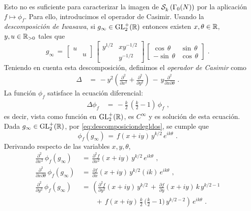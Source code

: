 Esto no es suficiente para caracterizar la imagen de $\mathcal{S}^{}_{k}\left(\Gamma_{0}(N)\right)$
por la aplicaci\'{o}n $f\mapsto\phi_{f}$. Para ello, introducimos el operador
de Casimir. Usando la \emph{descomposici\'{o}n de Iwasawa}, si
$g_{\infty}\in\mathrm{GL}^{+}_{2}(\mathbb{R})$ entonces existen $x,\theta\in\mathbb{R}$,
$y,u\in\mathbb{R}_{>0}$ tales que
\begin{equation}
	\label{eq:descomposiciondegldos}
	g_{\infty} \,=\,\begin{bmatrix} u & \\ & u \end{bmatrix}\,
		\begin{bmatrix} y^{1/2} & xy^{-1/2} \\
		& y^{-1/2} \end{bmatrix}\,
			\begin{bmatrix} \cos\,\theta & \sin\,\theta \\
			-\sin\,\theta & \cos\,\theta\end{bmatrix}
	\text{ .}
\end{equation}
%
Teniendo en cuenta esta descomposici\'{o}n, definimos el
\emph{operador de Casimir} como
\begin{align*}
	\Delta & \,=\, -y^{2}\left(
		\frac{\partial^{2}}{\partial x^{2}}+
		\frac{\partial^{2}}{\partial y^{2}} \right)\,-\,
		y\frac{\partial^{2}}{\partial x\partial\theta}
	\text{ .}
\end{align*}
%
La funci\'{o}n $\phi_{f}$ satisface la ecuaci\'{o}n diferencial:
\begin{align*}
	\Delta\phi_{f} & \,=\, -\frac{k}{2}\,
		\left(\frac{k}{2}-1\right)\,\phi_{f}
	\text{ ,}
\end{align*}
%
es decir, vista como funci\'{o}n en $\mathrm{GL}^{+}_{2}(\mathbb{R})$, es $C^{\infty}$ y
es soluci\'{o}n de esta ecuaci\'{o}n. Dada $g_{\infty}\in\mathrm{GL}^{+}_{2}(\mathbb{R})$,
por \eqref{eq:descomposiciondegldos}, se cumple que
\begin{equation}
	\label{eq:funcioncorrespondientefactorizacionelipticas}
	\phi_{f}(g_{\infty}) \,=\,f(x+iy)\,y^{k/2}\,e^{ik\theta}
	\text{ .}
\end{equation}
%
Derivando respecto de las variables $x,y,\theta$,
\begin{align*}
	\frac{\partial^{2}}{\partial x^{2}}\,\phi_{f}(g_{\infty})
		& \,=\,\frac{\partial^{2}f}{\partial x^{2}}(x+iy)\,
			y^{k/2}\,e^{ik\theta}\text{ ,} \\
	\frac{\partial^{2}}{\partial x\partial\theta}\,\phi_{f}(g_{\infty})
		& \,=\,\frac{\partial f}{\partial x}(x+iy)\,
			y^{k/2}(ik)\,e^{ik\theta}\text{ ,} \\
	\frac{\partial^{2}}{\partial y^{2}}\,\phi_{f}(g_{\infty})
		& \,=\,\left(\frac{\partial^{2}f}{\partial y^{2}}(x+iy)\,
			y^{k/2}\,+\,\frac{\partial f}{\partial y}(x+iy)\,
			k\,y^{k/2-1}\right. \\
		& \qquad\,+\,\left. f(x+iy)\,
			\tfrac{k}{2}\,\big(\tfrac{k}{2}-1\big)\,
			y^{k/2-2}\right)\,e^{ik\theta}
	\text{ .}
\end{align*}
